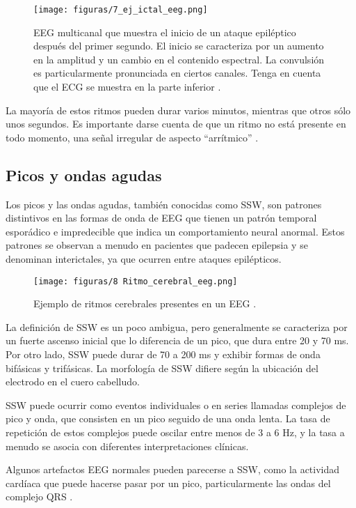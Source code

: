 \begin{figure}[t]
    \centering
    \texttt{[image: figuras/7\_ej\_ictal\_eeg.png]}
    \caption{EEG multicanal que muestra el inicio de un ataque epiléptico después del primer segundo. El inicio se caracteriza por un aumento en la amplitud y un cambio en el contenido espectral. La convulsión es particularmente pronunciada en ciertos canales. Tenga en cuenta que el ECG se muestra en la parte inferior \cite{Libro_SP_cocoro_neuro_app}.}
    \label{fig:ej_ictal_multicanal_book}
\end{figure}
La mayoría de estos ritmos pueden durar varios minutos, mientras que otros sólo unos segundos. Es importante darse cuenta de que un ritmo no está presente en todo momento, una señal irregular de aspecto ``arrítmico'' \cite{Libro_SP_cocoro_neuro_app}.

\subsection{Picos y ondas agudas}
Los picos y las ondas agudas, también conocidas como SSW, son patrones distintivos en las formas de onda de EEG que tienen un patrón temporal esporádico e impredecible que indica un comportamiento neural anormal. Estos patrones se observan a menudo en pacientes que padecen epilepsia y se denominan interictales, ya que ocurren entre ataques epilépticos.

\begin{figure}[t]
    \centering
    \texttt{[image: figuras/8 Ritmo\_cerebral\_eeg.png]}
    \caption{Ejemplo de ritmos cerebrales presentes en un EEG \cite{Vallat_2018}.}
    \label{fig:eeg_ritmo_cerebral}
\end{figure}

La definición de SSW es un poco ambigua, pero generalmente se caracteriza por un fuerte ascenso inicial que lo diferencia de un pico, que dura entre 20 y 70 ms. Por otro lado, SSW puede durar de 70 a 200 ms y exhibir formas de onda bifásicas y trifásicas. La morfología de SSW difiere según la ubicación del electrodo en el cuero cabelludo.

SSW puede ocurrir como eventos individuales o en series llamadas complejos de pico y onda, que consisten en un pico seguido de una onda lenta. La tasa de repetición de estos complejos puede oscilar entre menos de 3 a 6 Hz, y la tasa a menudo se asocia con diferentes interpretaciones clínicas.

Algunos artefactos EEG normales pueden parecerse a SSW, como la actividad cardíaca que puede hacerse pasar por un pico, particularmente las ondas del complejo QRS \cite{Libro_SP_cocoro_neuro_app}.

